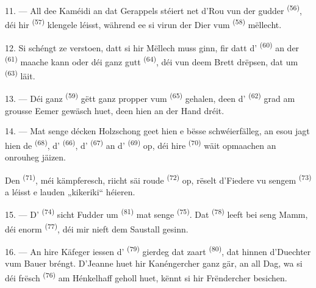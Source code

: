 11. --- All dee Kaméidi an dat Gerappels stéiert net d'Rou vun der gudder
 \textsuperscript{(56)}, déi hir 
\textsuperscript{(57)} klengele léisst, während ee si virun der Dier vum
 \textsuperscript{(58)} mëllecht.

12. Si schéngt ze verstoen, datt si hir Mëllech muss ginn, fir datt d'
\textsuperscript{(60)}  an der 
\textsuperscript{(61)} maache kann oder déi ganz gutt 
\textsuperscript{(64)}, déi vun deem Brett drëpsen, dat um 
\textsuperscript{(63)} läit.

13. --- Déi ganz  \textsuperscript{(59)} gëtt ganz propper vum
 \textsuperscript{(65)} gehalen, deen d'
\textsuperscript{(62)} grad am grousse Eemer gewäsch huet, deen hien an der Hand
dréit.

\VUsaut{3.0mm}
\VUsaut{3.0mm}

14. --- Mat senge décken Holzschong geet hien e bësse schwéierfälleg, an esou jagt
hien de  \textsuperscript{(68)}, d'
\textsuperscript{(66)}, d' \textsuperscript{(67)} an
d' \textsuperscript{(69)} op, déi hire 
\textsuperscript{(70)} wäit opmaachen an onrouheg jäizen.

Den  \textsuperscript{(71)}, méi kämpferesch, riicht säi roude
 \textsuperscript{(72)} op, rëselt d'Fiedere vu sengem
 \textsuperscript{(73)} a léisst e lauden „kikeriki“ héieren.

15. --- D' \textsuperscript{(74)} sicht Fudder um 
\textsuperscript{(81)} mat senge  \textsuperscript{(75)}. Dat
 \textsuperscript{(78)} leeft bei seng Mamm, déi enorm 
\textsuperscript{(77)}, déi mir nieft dem Saustall gesinn.

16. --- An hire Käfeger iessen d' \textsuperscript{(79)}
gierdeg dat zaart  \textsuperscript{(80)}, dat hinnen d'Duechter vum
Bauer bréngt. D'Jeanne huet hir Kanéngercher ganz gär, an all Dag, wa si déi frësch
 \textsuperscript{(76)} am Hénkelhaff geholl huet, kënnt si hir
Frëndercher besichen.

\VUsaut{6.0mm}
\VUfilet{22mm}
